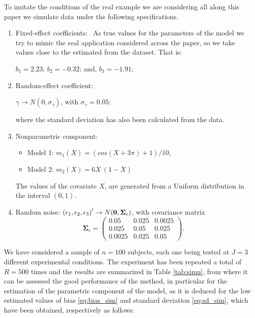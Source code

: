 \documentclass[sn-mathphys]{sn-jnl}%
\theoremstyle{thmstyleone}%
\theoremstyle{thmstyletwo}%
\theoremstyle{thmstylethree}%
\begin{document}
To imitate the conditions of the real example we are considering all along this paper we simulate data under the following specifications.
\begin{enumerate}
	\item Fixed-effect coefficients: \
	As true values for the parameters of the model we try to mimic the real application considered across the paper, so we take values close to the estimated from the dataset. That is:
	
	\begin{center}
		$b_1=2.23$;  $b_2= -0.32$; and, $b_3=-1.91$;
	\end{center}
	
	\item Random-effect coefficient:\ 
	\begin{center}
		$\gamma \rightarrow N (0, \sigma_{\gamma})$, with $\sigma_{\gamma}= 0.05$;
	\end{center}
	where the standard deviation has also been calculated from the data.
	\item Nonparametric component: 
	\begin{itemize}
		\item[] {Model 1}: $m_1(X) =  (cos(X+3\pi)+1)/10$, %
		\item[] {Model 2}: $m_2(X) = 6 X \ (1-X)$
	\end{itemize}
	The values of the covariate $X$, are generated from  a Uniform distribution in the interval $(0,1)$.
	\item Random noise: $\left(\epsilon_1,\epsilon_2,\epsilon_3\right)' \rightarrow N ({\bf 0}, {\mathbf \Sigma}_{\epsilon})$, with covariance matrix
	\[
	\mathbf{\Sigma}_{\epsilon}=\left(\begin{array}{ccc}
		0.05 & 0.025 & 0.0025 \\
		0.025 & 0.05 &0.025 \\
		0.0025& 0.025 & 0.05
	\end{array}
	\right).
	\]
	
	
\end{enumerate}
We have considered a sample of $n=100$ subjects, each one being tested at $J=3$ different experimental conditions. The experiment has been repeated a total of $R=500$ times and the results are summarized in Table \ref{tab:simu}, from where it can be assessed the good performance of the method, in particular for the estimation of the parametric component of the model, as it is deduced for the low estimated values of bias \eqref{eq:bias_sim} and standard deviation \eqref{eq:sd_sim}, which have been obtained, respectively as follows:
\end{document}
